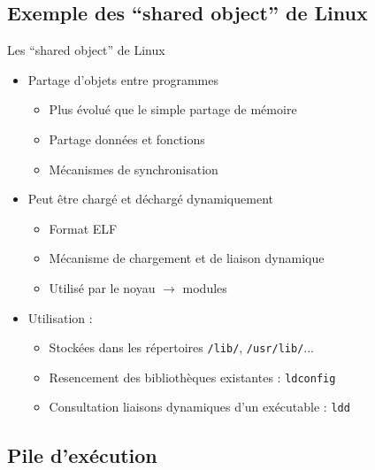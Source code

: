 \subsection{Exemple des “shared object” de Linux}

\begin{frame}{Les “shared object” de Linux}
\begin{itemize}
\item Partage d'objets entre programmes
\begin{itemize}
\item Plus évolué que le simple partage de mémoire
\item Partage données et fonctions
\item Mécanismes de synchronisation
\end{itemize}
\item Peut être chargé et déchargé dynamiquement
\begin{itemize}
\item Format ELF
\item Mécanisme de chargement et de liaison dynamique
\item Utilisé par le noyau $\rightarrow$  modules
\end{itemize}
\item Utilisation :
\begin{itemize}
\item Stockées dans les répertoires \texttt{/lib/}, \texttt{/usr/lib/}...
\item Resencement des bibliothèques existantes : \texttt{ldconfig}
\item Consultation liaisons dynamiques d'un exécutable : \texttt{ldd}
\end{itemize}
\end{itemize}
\end{frame}

\subsection{Pile d'exécution}

